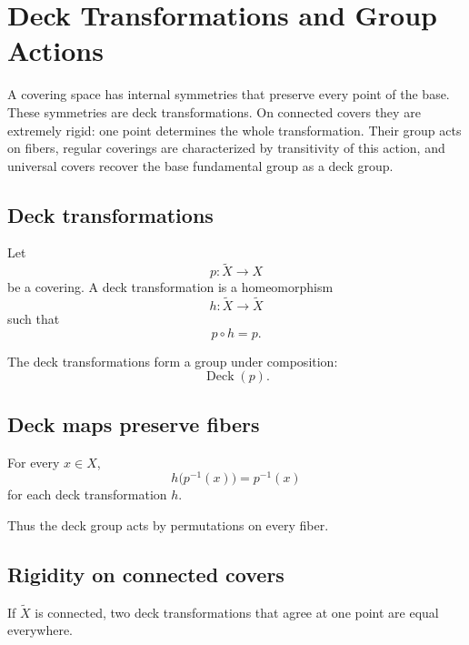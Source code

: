﻿\chapter{Deck Transformations and Group Actions}
\label{ch:viii12-deck-transformations}

A covering space has internal symmetries that preserve every point of the base.
These symmetries are deck transformations.  On connected covers they are
extremely rigid: one point determines the whole transformation.  Their group
acts on fibers, regular coverings are characterized by transitivity of this
action, and universal covers recover the base fundamental group as a deck
group.

\section{Deck transformations}

\begin{definition}
\label{def:viii12-deck}
Let
\[
p:\widetilde X\to X
\]
be a covering.  A deck transformation is a homeomorphism
\[
h:\widetilde X\to\widetilde X
\]
such that
\[
p\circ h=p.
\]
\end{definition}

The deck transformations form a group under composition:
\[
\operatorname{Deck}(p).
\]

\section{Deck maps preserve fibers}

\begin{proposition}
\label{prop:viii12-fiber}
For every \(x\in X\),
\[
h\bigl(p^{-1}(x)\bigr)=p^{-1}(x)
\]
for each deck transformation \(h\).
\end{proposition}

Thus the deck group acts by permutations on every fiber.

\section{Rigidity on connected covers}

\begin{theorem}
\label{thm:viii12-one-point}
If \(\widetilde X\) is connected, two deck transformations that agree at one
point are equal everywhere.
\end{theorem}


